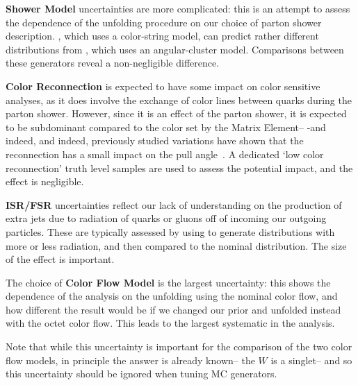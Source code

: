   \textbf{Shower Model} uncertainties are more complicated: this is an attempt to assess the dependence of the unfolding procedure on our choice of parton shower description. \Pythia, which uses a color-string model, can predict rather different distributions from \Herwig, which uses an angular-cluster model. Comparisons between these generators reveal a non-negligible difference. %


\textbf{Color Reconnection} is expected to have some impact on color sensitive analyses, as it does involve the exchange of color lines between quarks during the parton shower. However, since it is an effect of the parton shower, it is expected to be subdominant compared to the color set by the Matrix Element-- -and indeed, and indeed, previously studied variations have shown that the reconnection has a small impact on the pull angle~\cite{Altheimer:2013yza}.  A dedicated `low color reconnection' truth level samples are used to assess the potential impact, and the effect is negligible.


	\textbf{ISR/FSR} uncertainties reflect our lack of understanding on the production of extra jets due to radiation of quarks or gluons off of incoming our outgoing particles. These are typically assessed by using \Acermc to generate distributions with more or less radiation, and then compared to the nominal distribution. The size of the effect is important.

	The choice of \textbf{Color Flow Model} is the largest uncertainty: this shows the dependence of the analysis on the unfolding using the nominal color flow, and how different the result would be if we changed our prior and unfolded instead with the octet color flow. This leads to the largest systematic in the analysis.

	Note that while this uncertainty is important for the comparison of the two color flow models, in principle the answer is already known-- the $W$ is a singlet-- and so this uncertainty should be ignored when tuning MC generators.

